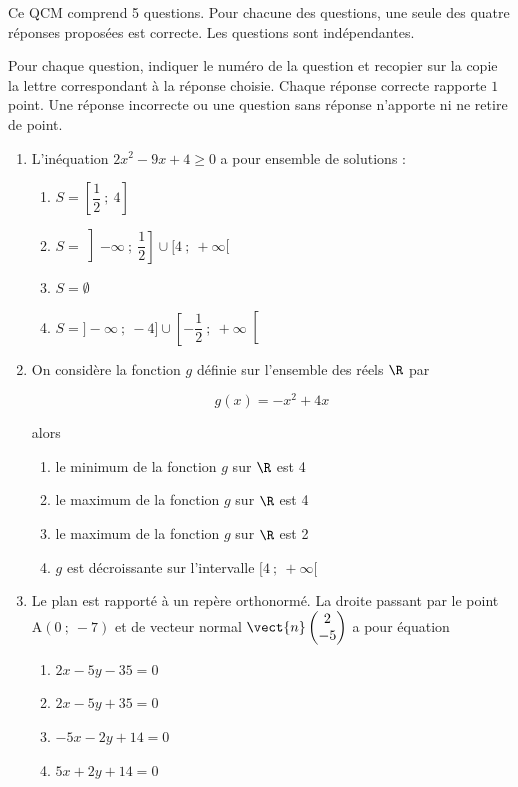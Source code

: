 \medskip


Ce QCM comprend 5 questions. Pour chacune des questions, une seule des quatre réponses proposées est correcte. Les questions sont indépendantes.

Pour chaque question, indiquer le numéro de la question et recopier sur la copie la lettre correspondant à la réponse choisie. Chaque réponse correcte rapporte $1$ point. Une réponse incorrecte ou une question sans réponse n'apporte ni ne retire de point.

\medskip

\begin{enumerate}
\item 
L'inéquation $2x^2 - 9x +4 \geqslant 0$ a pour ensemble de solutions :
	\begin{enumerate}
		\item $S= \left[\dfrac{1}{2}~;~4\right]$
		\item $S = \left ]-\infty~;~\dfrac{1}{2}\right ] \cup  [4~;~+\infty$[
		\item $S = \emptyset$ 
		\item $S = ]- \infty~;~-4] \cup \left [- \dfrac{1}{2}~;~+\infty\right [$
	\end{enumerate}
	
	\medskip
	
\item On considère la fonction $g$ définie sur l'ensemble des réels $\R$ par 

\[g(x) = -x^2 +4x\]

alors
	\begin{enumerate}
		\item le minimum de la fonction $g$ sur $\R$ est 4
		\item  le maximum de la fonction $g$ sur $\R$ est 4
		\item  le maximum de la fonction $g$ sur $\R$ est 2
		\item  $g$ est décroissante sur l'intervalle $[4~;~ +\infty[$
	\end{enumerate}
	
		\medskip

\item Le plan est rapporté à un repère orthonormé. La droite passant par le point A$(0~;~-7)$ et de vecteur normal $\vect{n}\begin{pmatrix}2\\-5\end{pmatrix}$ a pour équation
	\begin{enumerate}
		\item $2x - 5y - 35 = 0$ 
		\item $2x- 5y + 35 = 0$ 
		\item $-5x - 2y + 14 = 0$ 
		\item $5x+ 2y+ 14 = 0$
	\end{enumerate}
	

\end{enumerate}
